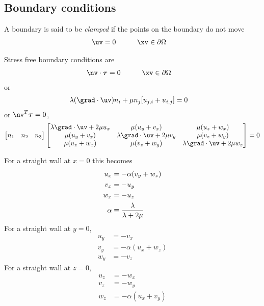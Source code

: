 \documentclass[11pt]{article}
\newcommand{\tauv}{\boldsymbol{\tau}}
\begin{document}
\subsection{Boundary conditions}

A boundary is said to be {\em clamped} if the points on the boundary do not move
\begin{alignat}{2}
  \uv &= 0 &&\qquad \xv\in\partial\Omega
\end{alignat}

Stress free boundary conditions are
\begin{alignat}{2}
  \nv\cdot\tauv &= 0 &&\qquad \xv\in\partial\Omega
\end{alignat}
or
\begin{align}
   \lambda (\grad\cdot\uv) n_i + \mu n_j[ u_{j,i} + u_{i,j} ] &= 0
\end{align}
or $\nv^T\tauv=0$, 
\begin{align}
  \begin{bmatrix} n_1 & n_2 & n_3 \end{bmatrix}
     \begin{bmatrix} 
        \lambda \grad\cdot\uv +2\mu u_x  & \mu(u_y+v_x) & \mu(u_z+w_x) \\
        \mu(u_y+v_x) &  \lambda \grad\cdot\uv +2\mu v_y  & \mu(v_z+w_y) \\
        \mu(u_z+w_x) & \mu(v_z+w_y) & \lambda \grad\cdot\uv +2\mu w_z   
     \end{bmatrix} =0
\end{align}

For a straight wall at $x=0$ this becomes
\begin{align}
   u_x &= - \alpha (v_y + w_z) \\
   v_x &= - u_y \\
   w_x &= -u_z \\
  \alpha &\equiv {\lambda\over \lambda+2\mu}
\end{align}
For a straight wall at $y=0$, 
\begin{align}
   u_y &= -v_x \\
   v_y &= - \alpha (u_x + w_z)  \\
   w_y &= -v_z 
\end{align}
For a straight wall at $z=0$, 
\begin{align}
   u_z &= -w_x \\
   v_z &= -w_y \\
   w_z &= - \alpha (u_x + v_y )
\end{align}
\end{document}
